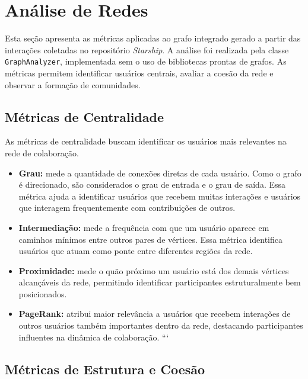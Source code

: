 \documentclass[12pt]{article}
\begin{document}
\section{Análise de Redes}

Esta seção apresenta as métricas aplicadas ao grafo integrado gerado a partir das interações coletadas no repositório \textit{Starship}. A análise foi realizada pela classe \texttt{GraphAnalyzer}, implementada sem o uso de bibliotecas prontas de grafos. As métricas permitem identificar usuários centrais, avaliar a coesão da rede e observar a formação de comunidades.

\subsection{Métricas de Centralidade}

As métricas de centralidade buscam identificar os usuários mais relevantes na rede de colaboração.

\begin{itemize}

\item \textbf{Grau:} mede a quantidade de conexões diretas de cada usuário. Como o grafo é direcionado, são considerados o grau de entrada e o grau de saída. Essa métrica ajuda a identificar usuários que recebem muitas interações e usuários que interagem frequentemente com contribuições de outros.

\item \textbf{Intermediação:} mede a frequência com que um usuário aparece em caminhos mínimos entre outros pares de vértices. Essa métrica identifica usuários que atuam como ponte entre diferentes regiões da rede.

\item \textbf{Proximidade:} mede o quão próximo um usuário está dos demais vértices alcançáveis da rede, permitindo identificar participantes estruturalmente bem posicionados.

\item \textbf{PageRank:} atribui maior relevância a usuários que recebem interações de outros usuários também importantes dentro da rede, destacando participantes influentes na dinâmica de colaboração.
```

\end{itemize}

\subsection{Métricas de Estrutura e Coesão}
\end{document}
